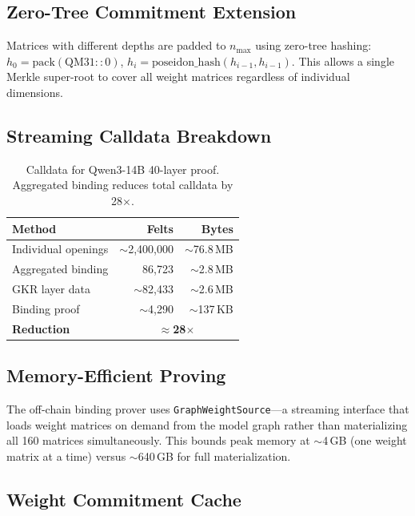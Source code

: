 \documentclass[10pt,twocolumn]{article}
\theoremstyle{definition}
\theoremstyle{remark}
\newcommand{\QM}{\mathrm{QM31}}
\begin{document}
\subsection{Zero-Tree Commitment Extension}

Matrices with different depths are padded to $n_{\max}$ using
zero-tree hashing: $h_0 = \text{pack}(\QM::0)$,
$h_i = \text{poseidon\_hash}(h_{i-1}, h_{i-1})$.
This allows a single Merkle super-root to cover all weight matrices
regardless of individual dimensions.

\subsection{Streaming Calldata Breakdown}

\begin{table}[t]
  \centering\small
  \caption{Calldata for Qwen3-14B 40-layer proof.
           Aggregated binding reduces total calldata by 28$\times$.}
  \label{tab:calldata}
  \begin{tabular}{@{}lrr@{}}
    \toprule
    \textbf{Method} & \textbf{Felts} & \textbf{Bytes} \\
    \midrule
    Individual openings & $\sim$2{,}400{,}000 & $\sim$76.8\,MB \\
    Aggregated binding  & 86{,}723 & $\sim$2.8\,MB \\
    \quad GKR layer data & $\sim$82{,}433 & $\sim$2.6\,MB \\
    \quad Binding proof  & $\sim$4{,}290 & $\sim$137\,KB \\
    \midrule
    \textbf{Reduction}  & \multicolumn{2}{c}{\textbf{$\approx$28$\times$}} \\
    \bottomrule
  \end{tabular}
\end{table}

\subsection{Memory-Efficient Proving}

The off-chain binding prover uses \texttt{GraphWeightSource}---a
streaming interface that loads weight matrices on demand from the
model graph rather than materializing all 160 matrices simultaneously.
This bounds peak memory at $\sim$4\,GB (one weight matrix at a time)
versus $\sim$640\,GB for full materialization.

\subsection{Weight Commitment Cache}
\end{document}

